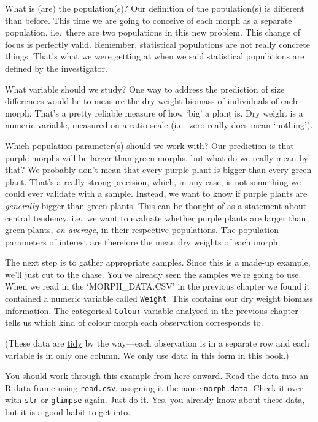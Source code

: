 \documentclass[]{book}
\begin{document}
What is (are) the population(s)? Our definition of the population(s) is
different than before. This time we are going to conceive of each morph
as a separate population, i.e.~there are two populations in this new
problem. This change of focus is perfectly valid. Remember, statistical
populations are not really concrete things. That's what we were getting
at when we said statistical populations are defined by the investigator.

What variable should we study? One way to address the prediction of size
differences would be to measure the dry weight biomass of individuals of
each morph. That's a pretty reliable measure of how `big' a plant is.
Dry weight is a numeric variable, measured on a ratio scale (i.e.~zero
really does mean `nothing').

Which population parameter(s) should we work with? Our prediction is
that purple morphs will be larger than green morphs, but what do we
really mean by that? We probably don't mean that every purple plant is
bigger than every green plant. That's a really strong precision, which,
in any case, is not something we could ever validate with a sample.
Instead, we want to know if purple plants are \emph{generally} bigger
than green plants. This can be thought of as a statement about central
tendency, i.e.~we want to evaluate whether purple plants are larger than
green plants, \emph{on average}, in their respective populations. The
population parameters of interest are therefore the mean dry weights of
each morph.

The next step is to gather appropriate samples. Since this is a made-up
example, we'll just cut to the chase. You've already seen the samples
we're going to use. When we read in the `MORPH\_DATA.CSV' in the
previous chapter we found it contained a numeric variable called
\texttt{Weight}. This contains our dry weight biomass information. The
categorical \texttt{Colour} variable analysed in the previous chapter
tells us which kind of colour morph each observation corresponds to.

(These data are
\href{https://cran.r-project.org/web/packages/tidyr/vignettes/tidy-data.html}{tidy}
by the way---each observation is in a separate row and each variable is
in only one column. We only use data in this form in this book.)

\begin{do-something}
You should work through this example from here onward. Read the data
into an R data frame using \texttt{read.csv}, assigning it the name
\texttt{morph.data}. Check it over with \texttt{str} or \texttt{glimpse}
again. Just do it. Yes, you already know about these data, but it is a
good habit to get into.
\end{do-something}
\end{document}
